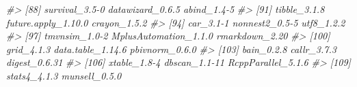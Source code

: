 \documentclass[
  man,floatsintext]{apa6}
\newenvironment{Shaded}{\begin{snugshade}}{\end{snugshade}}
\newcommand{\CommentTok}[1]{\textcolor[rgb]{0.56,0.35,0.01}{\textit{#1}}}
\begin{document}
\begin{Shaded}
\begin{Highlighting}[]
\CommentTok{\#\textgreater{}  [88] survival\_3.5{-}0        datawizard\_0.6.5      abind\_1.4{-}5          }
\CommentTok{\#\textgreater{}  [91] tibble\_3.1.8          future.apply\_1.10.0   crayon\_1.5.2         }
\CommentTok{\#\textgreater{}  [94] car\_3.1{-}1             nonnest2\_0.5{-}5        utf8\_1.2.2           }
\CommentTok{\#\textgreater{}  [97] tmvnsim\_1.0{-}2         MplusAutomation\_1.1.0 rmarkdown\_2.20       }
\CommentTok{\#\textgreater{} [100] grid\_4.1.3            data.table\_1.14.6     pbivnorm\_0.6.0       }
\CommentTok{\#\textgreater{} [103] bain\_0.2.8            callr\_3.7.3           digest\_0.6.31        }
\CommentTok{\#\textgreater{} [106] xtable\_1.8{-}4          dbscan\_1.1{-}11         RcppParallel\_5.1.6   }
\CommentTok{\#\textgreater{} [109] stats4\_4.1.3          munsell\_0.5.0}
\end{Highlighting}
\end{Shaded}
\end{document}
